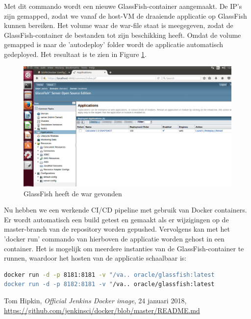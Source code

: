 \documentclass[12pt]{article}
\begin{document}
\noindent Met dit commando wordt een nieuwe GlassFish-container aangemaakt. De IP's zijn gemapped, zodat we vanaf de host-VM de draaiende applicatie op GlassFish kunnen bereiken. Het volume waar de war-file staat is meegegeven, zodat de GlassFish-container de bestanden tot zijn beschikking heeft. Omdat de volume gemapped is naar de 'autodeploy' folder wordt de applicatie automatisch gedeployed. Het resultaat is te zien in Figure \ref{fig:glassfish_application}.

\begin{figure}[H]
	\begin{center}
		\includegraphics[width=1.0\textwidth]{images/applications_glassfish.png}
		\caption{GlassFish heeft de war gevonden\label{fig:glassfish_application}}
	\end{center}
\end{figure}

Nu hebben we een werkende CI/CD pipeline met gebruik van Docker containers. Er wordt automatisch een build getest en gemaakt als er wijzigingen op de master-branch van de repository worden gepushed. Vervolgens kan met het 'docker run' commando van hierboven de applicatie worden gehost in een container. Het is mogelijk om meerdere instanties van de GlassFish-container te runnen, waardoor het hosten van de applicatie schaalbaar is:

\begin{lstlisting}[language=Bash]
docker run -d -p 8181:8181 -v "/va.. oracle/glassfish:latest
docker run -d -p 8182:8181 -v "/va.. oracle/glassfish:latest
\end{lstlisting}

\begin{thebibliography}{9}
		Tom Hipkin,
		\textit{Official Jenkins Docker image},
		24 januari 2018,
		\url{https://github.com/jenkinsci/docker/blob/master/README.md}
\end{thebibliography}
\end{document}
